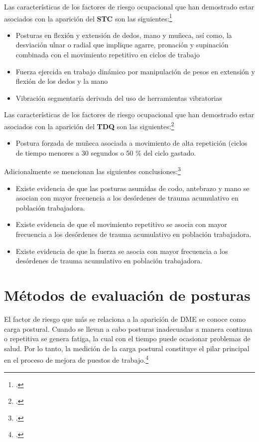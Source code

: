 Las características de los factores de riesgo ocupacional que han demostrado estar asociados con la aparición del \textbf{STC} son las siguientes:\footcite[45]{MinisterioQue}
\begin{itemize}
\item Posturas en flexión y extensión de dedos, mano y muñeca, así como, la desviación ulnar o radial que implique agarre, pronación y supinación combinada con el movimiento repetitivo en ciclos de trabajo
\item Fuerza ejercida en trabajo dinámico por manipulación de pesos en extensión y flexión de los dedos y la mano
\item Vibración segmentaría derivada del uso de herramientas vibratorias
\end{itemize}
Las características de los factores de riesgo ocupacional que han demostrado estar asociados con la aparición del \textbf{TDQ} son las siguientes:\footcite[45]{MinisterioQue}
\begin{itemize}
\item Postura forzada de muñeca asociada a movimiento de alta repetición (ciclos de tiempo menores a 30 segundos o 50 \% del ciclo gastado.
\end{itemize}
Adicionalmente se mencionan las siguientes conclusiones:\footcite[46]{MinisterioQue}
\begin{itemize}
\item Existe evidencia de que las posturas asumidas de codo, antebrazo y mano se asocian con mayor frecuencia a los desórdenes de trauma acumulativo en población trabajadora.
\item Existe evidencia de que el movimiento repetitivo se asocia con mayor frecuencia a los desórdenes de trauma acumulativo en población trabajadora.
\item Existe evidencia de que la fuerza se asocia con mayor frecuencia a los desórdenes de trauma acumulativo en población trabajadora.
\end{itemize}



\section{Métodos de evaluación de posturas}
El factor de riesgo que más se relaciona a la aparición de DME se conoce como carga postural. Cuando se llevan a cabo posturas inadecuadas a manera continua o repetitiva se genera fatiga, la cual con el tiempo puede ocasionar problemas de salud. Por lo tanto, la medición de la carga postural constituye el pilar principal en el proceso de mejora de puestos de trabajo.\footcite[144]{RamosEdgarShrawan2004WorkingReview}
